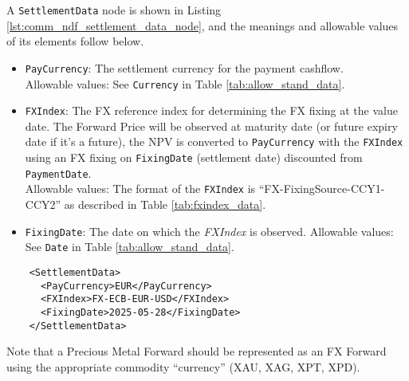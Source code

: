 A \lstinline!SettlementData! node is shown in Listing \ref{lst:comm_ndf_settlement_data_node}, and the meanings and allowable values of its elements follow below.

\begin{itemize}
\item \lstinline!PayCurrency!: The settlement currency for the payment cashflow. \\
Allowable values:  See \lstinline!Currency! in Table \ref{tab:allow_stand_data}.
\item \lstinline!FXIndex!: The FX reference index for determining the FX fixing at the value date. The Forward Price will be observed at maturity date (or future expiry date if it’s a future), the NPV is converted to \lstinline!PayCurrency! with the \lstinline!FXIndex! using an FX fixing on \lstinline!FixingDate! (settlement date) discounted from \lstinline!PaymentDate!. \\
Allowable values: The format of the \lstinline!FXIndex! is ``FX-FixingSource-CCY1-CCY2'' as described in Table \ref{tab:fxindex_data}.
\item \lstinline!FixingDate!: The date on which the \emph{FXIndex} is observed.
Allowable values: See \lstinline!Date! in Table \ref{tab:allow_stand_data}.
\end{itemize}

\begin{listing}[H]
  \begin{verbatim}
    <SettlementData>
      <PayCurrency>EUR</PayCurrency>
      <FXIndex>FX-ECB-EUR-USD</FXIndex>
      <FixingDate>2025-05-28</FixingDate>
    </SettlementData>
  \end{verbatim}
  \caption{Example \lstinline!SettlementData! node with \lstinline!Rules! sub-node}
  \label{lst:comm_ndf_settlement_data_node}
\end{listing}

Note that a Precious Metal Forward should be represented as an FX Forward using the appropriate commodity ``currency'' (XAU, XAG, XPT, XPD).
